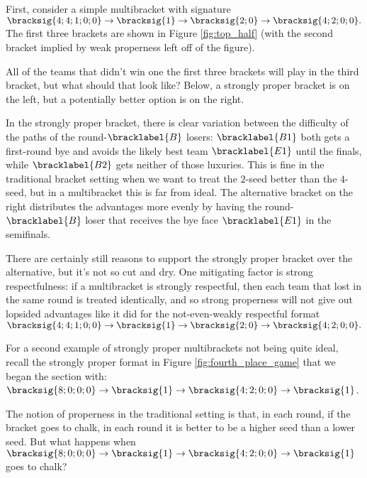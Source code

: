 {    First, consider a simple multibracket with signature $\bracksig{4;4;1;0;0} \to \bracksig{1} \to \bracksig{2;0} \to \bracksig{4;2;0;0}.$ The first three brackets are shown in Figure \ref{fig:top_half} (with the second bracket implied by weak properness left off of the figure).


    All of the teams that didn't win one the first three brackets will play in the third bracket, but what should that look like? Below, a strongly proper bracket is on the left, but a potentially better option is on the right.


    In the strongly proper bracket, there is clear variation between the difficulty of the paths of the round-$\bracklabel{B}$ losers: $\bracklabel{B1}$ both gets a first-round bye and avoids the likely best team $\bracklabel{E1}$ until the finals, while $\bracklabel{B2}$ gets neither of those luxuries. This is fine in the traditional bracket setting when we want to treat the $2$-seed better than the $4$-seed, but in a multibracket this is far from ideal. The alternative bracket on the right distributes the advantages more evenly by having the round-$\bracklabel{B}$ loser that receives the bye face $\bracklabel{E1}$ in the semifinals.
    
    There are certainly still reasons to support the strongly proper bracket over the alternative, but it's not so cut and dry. One mitigating factor is strong respectfulness: if a multibracket is strongly respectful, then each team that lost in the same round is treated identically, and so strong properness will not give out lopsided advantages like it did for the not-even-weakly respectful format $\bracksig{4;4;1;0;0} \to \bracksig{1} \to \bracksig{2;0} \to \bracksig{4;2;0;0}.$

    For a second example of strongly proper multibrackets not being quite ideal, recall the strongly proper format in Figure \ref{fig:fourth_place_game} that we began the section with: $\bracksig{8;0;0;0} \to \bracksig{1} \to \bracksig{4; 2; 0; 0} \to \bracksig{1}$.

    The notion of properness in the traditional setting is that, in each round, if the bracket goes to chalk, in each round it is better to be a higher seed than a lower seed. But what happens when $\bracksig{8;0;0;0} \to \bracksig{1} \to \bracksig{4; 2; 0; 0} \to \bracksig{1}$ goes to chalk?

}
